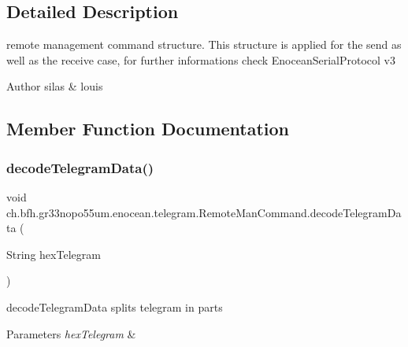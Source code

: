 \subsection{Detailed Description}
remote management command structure. This structure is applied for the send as well as the receive case, for further informations check Enocean\+Serial\+Protocol v3

\begin{DoxyAuthor}{Author}
silas \& louis 
\end{DoxyAuthor}


\subsection{Member Function Documentation}
\hypertarget{classch_1_1bfh_1_1gr33nopo55um_1_1enocean_1_1telegram_1_1_remote_man_command_a111c14179b713ad21ad3788f71b88740}{}\label{classch_1_1bfh_1_1gr33nopo55um_1_1enocean_1_1telegram_1_1_remote_man_command_a111c14179b713ad21ad3788f71b88740} 
\subsubsection{\texorpdfstring{decode\+Telegram\+Data()}{decodeTelegramData()}}
{\footnotesize\ttfamily void ch.\+bfh.\+gr33nopo55um.\+enocean.\+telegram.\+Remote\+Man\+Command.\+decode\+Telegram\+Data (\begin{DoxyParamCaption}\item[{String}]{hex\+Telegram }\end{DoxyParamCaption})}

decode\+Telegram\+Data splits telegram in parts


\begin{DoxyParams}{Parameters}
{\em hex\+Telegram} & \\
\hline
\end{DoxyParams}
\hypertarget{classch_1_1bfh_1_1gr33nopo55um_1_1enocean_1_1telegram_1_1_remote_man_command_aa1b0cdd23d15c1712683defdb00a08e3}{}\label{classch_1_1bfh_1_1gr33nopo55um_1_1enocean_1_1telegram_1_1_remote_man_command_aa1b0cdd23d15c1712683defdb00a08e3} 
